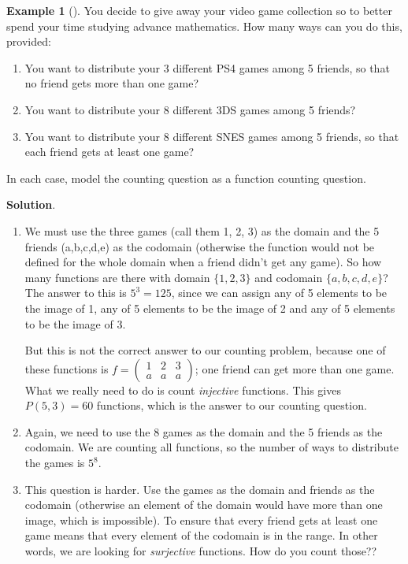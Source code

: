 \documentclass[10pt,]{book}
\theoremstyle{plain}
\theoremstyle{definition}
\theoremstyle{definition}
\newtheorem{example}[theorem]{Example}
\theoremstyle{definition}
\theoremstyle{definition}
\numberwithin{equation}{chapter}
\newcommand{\twoline}[2]{\begin{pmatrix}#1 \\ #2 \end{pmatrix}}
\newcommand{\amp}{&}
\begin{document}
\begin{example}[]\label{example-16}
\hypertarget{p-881}{}%
You decide to give away your video game collection so to better spend your time studying advance mathematics. How many ways can you do this, provided: \leavevmode%
\begin{enumerate}
\item\hypertarget{li-138}{}You want to distribute your 3 different PS4 games among 5 friends, so that no friend gets more than one game?%
\item\hypertarget{li-139}{}You want to distribute your 8 different 3DS games among 5 friends?%
\item\hypertarget{li-140}{}You want to distribute your 8 different SNES games among 5 friends, so that each friend gets at least one game?%
\end{enumerate}
 In each case, model the counting question as a function counting question.%
\par\smallskip%
\noindent\textbf{Solution}.\hypertarget{solution-81}{}\quad%
\hypertarget{p-882}{}%
\leavevmode%
\begin{enumerate}
\item\hypertarget{li-141}{}\hypertarget{p-883}{}%
We must use the three games (call them 1, 2, 3) as the domain and the 5 friends (a,b,c,d,e) as the codomain (otherwise the function would not be defined for the whole domain when a friend didn't get any game).  So how many functions are there with domain \(\{1,2,3\}\) and codomain \(\{a,b,c,d,e\}\)?  The answer to this is \(5^3=125\), since we can assign any of 5 elements to be the image of 1, any of 5 elements to be the image of 2 and any of 5 elements to be the image of 3.%
\par
\hypertarget{p-884}{}%
But this is not the correct answer to our counting problem, because one of these functions is \(f= \twoline{1\amp 2\amp 3}{a\amp a\amp a}\); one friend can get more than one game.  What we really need to do is count \emph{injective} functions.  This gives \(P(5,3) = 60\) functions, which is the answer to our counting question.%
\item\hypertarget{li-142}{}\hypertarget{p-885}{}%
Again, we need to use the 8 games as the domain and the 5 friends as the codomain.  We are counting all functions, so the number of ways to distribute the games is \(5^8\).%
\item\hypertarget{li-143}{}\hypertarget{p-886}{}%
This question is harder.  Use the games as the domain and friends as the codomain (otherwise an element of the domain would have more than one image, which is impossible).  To ensure that every friend gets at least one game means that every element of the codomain is in the range.  In other words, we are looking for \emph{surjective} functions. How do you count those??%
\end{enumerate}
%
\end{example}
\end{document}
